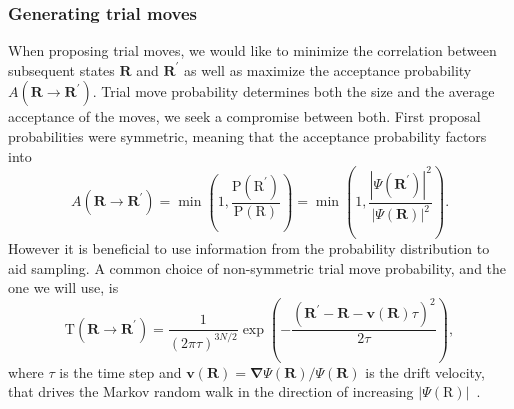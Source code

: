 \documentclass[final,3p,times,twocolumn]{elsarticle}
\begin{document}
	\subsubsection{Generating trial moves}
	When proposing trial moves, we would like to minimize the correlation between subsequent states $\mathbf{R}$ and $\mathbf{R}^\prime$ as well as maximize the acceptance probability $A(\mathbf{R} \rightarrow \mathbf{R}^{\prime})$. Trial move probability determines both the size and the average acceptance of the moves, we seek a compromise between both. First proposal probabilities were symmetric, meaning that the acceptance probability factors into
	\begin{equation}
		A\left(\mathbf{R} \rightarrow \mathbf{R}^{\prime}\right)=\min \left(1, \frac{\mathrm{P}(\mathrm{R}^{\prime})}{\mathrm{P}(\mathrm{R})}\right) = \min\left(1, \frac{|\Psi(\mathbf{R}^\prime)|^2}{|\Psi(\mathbf{R})|^2}\right).
	\end{equation}
	However it is beneficial to use information from the probability distribution to aid sampling. A common choice of non-symmetric trial move probability, and the one we will use, is 
	\begin{equation}
		\label{eq:trialmove}
		\mathrm{T}\left(\mathbf{R} \rightarrow \mathbf{R}^{\prime}\right) = \frac{1}{(2 \pi \tau)^{3 N / 2}}\exp\left({-} \frac{\left(\mathbf{R}^{\prime}-\mathbf{R}-\mathbf{v}\left(\mathbf{R}\right) \tau\right)^{2}}{2 \tau}\right),
	\end{equation}
	where $\tau$ is the time step and $\mathbf{v}(\mathbf{R})=\boldsymbol{\nabla} \Psi(\mathbf{R}) / \Psi(\mathbf{R})$ is the drift velocity, that drives the Markov random walk in the direction of increasing $|\Psi(\mathrm{R})|$~\cite{gubernatis_kawashima_werner_2016}.
	
\end{document}
